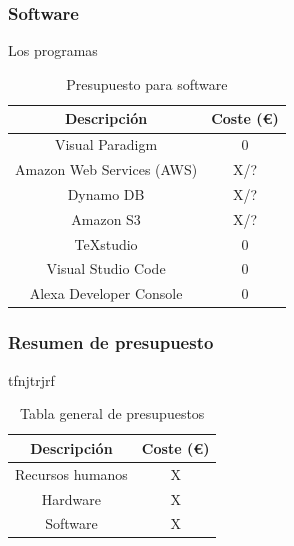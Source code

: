\subsubsection{Software}
Los programas 

\begin{table}[H]
    \centering
    \begin{tabular}{|c|c|}
    \hline
    \rowcolor{lightgray}
    \textbf{Descripción} & \textbf{Coste (€)}\\
    \hline
    Visual Paradigm & 0 \\
    \hline
    Amazon Web Services (AWS) & X/? \\
    \hline
    Dynamo DB & X/? \\
    \hline
    Amazon S3 & X/? \\
    \hline
    TeXstudio & 0 \\
    \hline
    Visual Studio Code & 0 \\
    \hline
    Alexa Developer Console & 0 \\
    \hline
    \end{tabular}
    \caption{Presupuesto para software}
    \label{tab:presupuesto-sw}
\end{table}

\subsubsection{Resumen de presupuesto}
tfnjtrjrf

\begin{table}[H]
    \centering
    \begin{tabular}{|c|c|}
        \hline
        \rowcolor{lightgray}
        \textbf{Descripción} & \textbf{Coste (€)} \\
        \hline
        Recursos humanos & X \\
        \hline
        Hardware & X \\
        \hline
        Software & X \\
        \hline
    \end{tabular}
    \caption{Tabla general de presupuestos}
    \label{tab:presupuesto-total}
\end{table}
